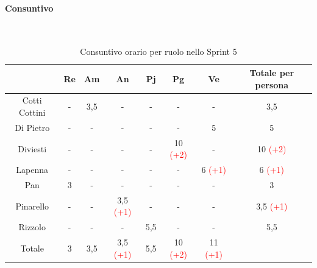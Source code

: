 \documentclass{article}
\begin{document}
                \paragraph{Consuntivo}\mbox{}\\
                \begin{table}[H]
                    \centering
                    \begin{tabular}{|c|c|c|c|c|c|c|c|}
                    \hline
                                    & Re  & Am  & An  & Pj  & Pg  & Ve  & Totale per persona \\ \hline
                    Cotti Cottini & -   & 3,5 & -   & -   & -   & -   & 3,5                \\ \hline
                    Di Pietro     & -   & -   & -   & -   & -   & 5   & 5                  \\ \hline
                    Diviesti      & -   & -   & -   & -   & 10 \textcolor{red}{(+2)}  & -   & 10 \textcolor{red}{(+2)}                 \\ \hline
                    Lapenna       & -   & -   & -   & -   & -   & 6 \textcolor{red}{(+1)}  & 6 \textcolor{red}{(+1)}                  \\ \hline
                    Pan           & 3   & -   & -   & -   & -   & -   & 3                  \\ \hline
                    Pinarello     & -   & -   & 3,5 \textcolor{red}{(+1)} & -   & -   & -   & 3,5 \textcolor{red}{(+1)}               \\ \hline
                    Rizzolo       & -   & -   & -   & 5,5 & -   & -   & 5,5                \\ \hline
                    Totale        & 3   & 3,5 & 3,5 \textcolor{red}{(+1)} & 5,5 & 10 \textcolor{red}{(+2)}  & 11 \textcolor{red}{(+1)}  &                    \\ \hline
                    \end{tabular}
                    \caption{Consuntivo orario per ruolo nello Sprint 5}
                \end{table}

\end{document}
